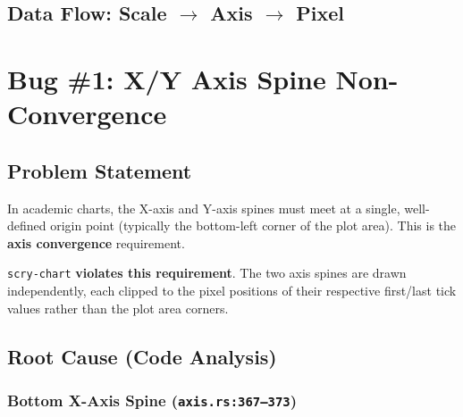 \documentclass[11pt,a4paper]{article}
\begin{document}
\subsection{Data Flow: Scale {$\to$} Axis {$\to$} Pixel}

\begin{center}
\end{center}

\section{Bug \#1: X/Y Axis Spine Non-Convergence}
\label{sec:convergence}

\subsection{Problem Statement}
In academic charts, the X-axis and Y-axis spines must meet at a single,
well-defined origin point (typically the bottom-left corner of the plot area).
This is the \textbf{axis convergence} requirement.

\texttt{scry-chart} \textbf{violates this requirement}. The two axis spines
are drawn independently, each clipped to the pixel positions of their
respective first/last tick values rather than the plot area corners.

\subsection{Root Cause (Code Analysis)}

\subsubsection{Bottom X-Axis Spine (\texttt{axis.rs:367--373})}
\end{document}
